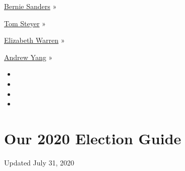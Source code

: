 \href{https://www.nytimes.com/interactive/2020/us/elections/bernie-sanders.html}{Bernie
Sanders} »

\href{https://www.nytimes.com/interactive/2020/us/elections/tom-steyer.html}{Tom
Steyer} »

\href{https://www.nytimes.com/interactive/2020/us/elections/elizabeth-warren.html}{Elizabeth
Warren} »

\href{https://www.nytimes.com/interactive/2020/us/elections/andrew-yang.html}{Andrew
Yang} »

\begin{itemize}
\item
\item
\item
\item
\end{itemize}

\hypertarget{our-2020-election-guide}{%
\section{Our 2020 Election Guide}\label{our-2020-election-guide}}

Updated July 31, 2020

